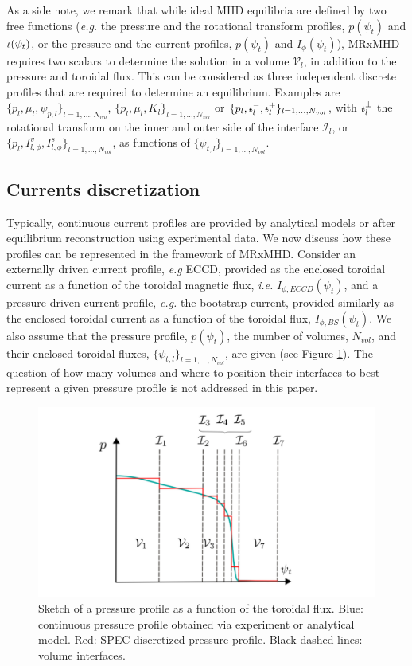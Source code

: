 \documentclass[my_thesis.tex]{subfiles}
\begin{document}
As a side note, we remark that while ideal \ac{MHD} equilibria are defined by two free functions (\textit{e.g.} the pressure and the rotational transform profiles, $p(\psi_t)$ and $\text{$\iota\!\!$-}(\psi_t)$, or the pressure and the current profiles, $p(\psi_t)$ and $I_\phi(\psi_t)$), \ac{MRxMHD} requires two scalars to determine the solution in a volume $\mathcal{V}_l$, in addition to the pressure and toroidal flux. This can be considered as three independent discrete profiles that are required to determine an equilibrium. Examples are $\{p_l, \mu_l, \psi_{p,l}\}_{l=1,\ldots,N_{vol}}$, $\{p_l, \mu_l, K_l\}_{l=1,\ldots,N_{vol}}$ or $\{p_l,\text{$\iota\!\!$-}^-_l,\text{$\iota\!\!$-}^+_l\}_{l=1,\ldots,N_{vol}}$, with $\text{$\iota\!\!$-}^\pm_l$ the rotational transform on the inner and outer side of the interface $\mathcal{I}_l$, or $\{p_l,I^v_{l,\phi},I^s_{l,\phi}\}_{l=1,\ldots,N_{vol}}$, as functions of $\{\psi_{t,l}\}_{l=1,\ldots,N_{vol}}$.


\subsection{Currents discretization}
Typically, continuous current profiles are provided by analytical models or after equilibrium reconstruction using experimental data. We now discuss how these profiles can be represented in the framework of \ac{MRxMHD}. Consider an externally driven current profile, \textit{e.g} \ac{ECCD}, provided as the enclosed toroidal current as a function of the toroidal magnetic flux, \textit{i.e.} $I_{\phi,ECCD}(\psi_t)$, and a pressure-driven current profile, \textit{e.g.} the bootstrap current, provided similarly as the enclosed toroidal current as a function of the toroidal flux, $I_{\phi,BS}(\psi_t)$. We also assume that the pressure profile, $p(\psi_t)$, the number of volumes, $N_{vol}$, and their enclosed toroidal fluxes, $\{\psi_{t,l}\}_{l=1,\ldots,N_{vol}}$, are given (see Figure \ref{fig:sketch_pressure}). The question of how many volumes and where to position their interfaces to best represent a given pressure profile is not addressed in this paper.

\begin{figure}
    \centering
    \includegraphics[width=\linewidth]{main/Figures_CurrentConstraint/ABaillod_fig2.pdf}
    \caption{Sketch of a pressure profile as a function of the toroidal flux. Blue: continuous pressure profile obtained via experiment or analytical model. Red: SPEC discretized pressure profile. Black dashed lines: volume interfaces.}
    \label{fig:sketch_pressure}
\end{figure}
\end{document}
